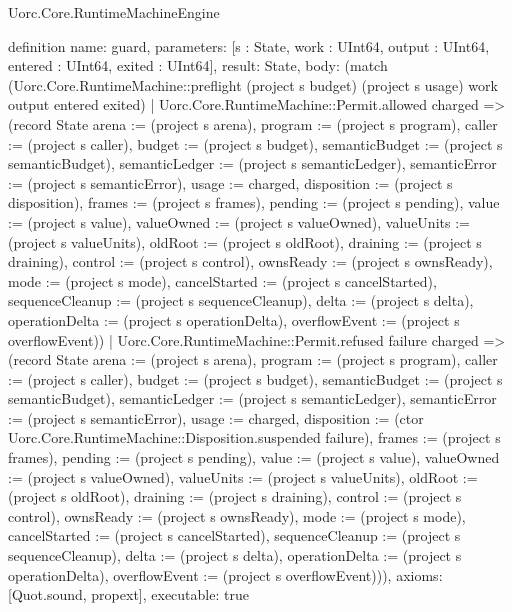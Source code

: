 \begin{lexlean}{Uorc.Core.RuntimeMachineEngine}
\begin{semanticmodule}
definition{
  name: guard,
  parameters: [s : State, work : UInt64, output : UInt64, entered : UInt64, exited : UInt64],
  result: State,
  body: (match (Uorc.Core.RuntimeMachine::preflight (project s budget) (project s usage) work output entered exited)
    | Uorc.Core.RuntimeMachine::Permit.allowed charged => (record State {arena := (project s arena), program := (project s program), caller := (project s caller), budget := (project s budget), semanticBudget := (project s semanticBudget), semanticLedger := (project s semanticLedger), semanticError := (project s semanticError), usage := charged, disposition := (project s disposition), frames := (project s frames), pending := (project s pending), value := (project s value), valueOwned := (project s valueOwned), valueUnits := (project s valueUnits), oldRoot := (project s oldRoot), draining := (project s draining), control := (project s control), ownsReady := (project s ownsReady), mode := (project s mode), cancelStarted := (project s cancelStarted), sequenceCleanup := (project s sequenceCleanup), delta := (project s delta), operationDelta := (project s operationDelta), overflowEvent := (project s overflowEvent)})
    | Uorc.Core.RuntimeMachine::Permit.refused failure charged => (record State {arena := (project s arena), program := (project s program), caller := (project s caller), budget := (project s budget), semanticBudget := (project s semanticBudget), semanticLedger := (project s semanticLedger), semanticError := (project s semanticError), usage := charged, disposition := (ctor Uorc.Core.RuntimeMachine::Disposition.suspended failure), frames := (project s frames), pending := (project s pending), value := (project s value), valueOwned := (project s valueOwned), valueUnits := (project s valueUnits), oldRoot := (project s oldRoot), draining := (project s draining), control := (project s control), ownsReady := (project s ownsReady), mode := (project s mode), cancelStarted := (project s cancelStarted), sequenceCleanup := (project s sequenceCleanup), delta := (project s delta), operationDelta := (project s operationDelta), overflowEvent := (project s overflowEvent)})),
  axioms: [Quot.sound, propext],
  executable: true
}


\end{semanticmodule}
\end{lexlean}
